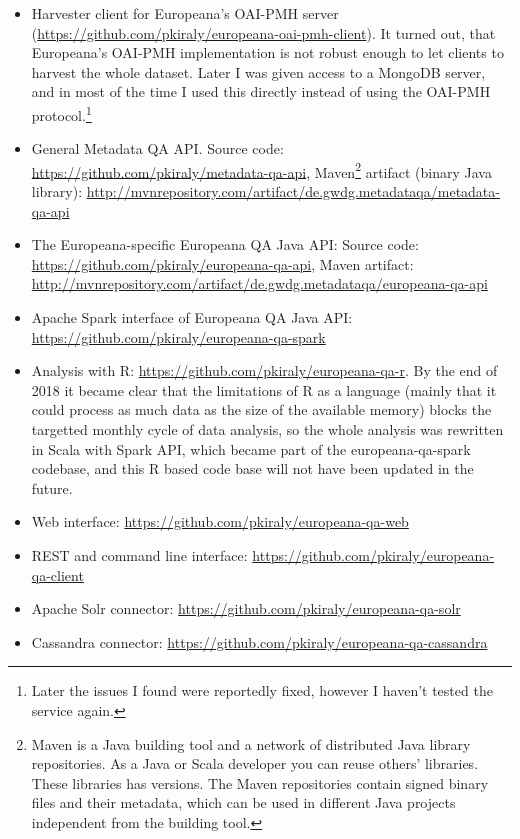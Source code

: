 \begin{itemize}
  \setlength{\parskip}{0pt}
  \setlength{\itemsep}{0pt plus 1pt}
\item Harvester client for Europeana's OAI-PMH server (\url{https://github.com/pkiraly/europeana-oai-pmh-client}). It turned out, that Europeana's OAI-PMH implementation is not robust enough to let clients to harvest the whole dataset. Later I was given access to a MongoDB server, and in most of the time I used this directly instead of using the OAI-PMH protocol.\footnote{Later the issues I found were reportedly fixed, however I haven't tested the service again.}
\item General Metadata QA API. Source code: \url{https://github.com/pkiraly/metadata-qa-api},
Maven\footnote{Maven is a Java building tool and a network of distributed Java library repositories. As a Java or Scala developer you can reuse others' libraries. These libraries has versions. The Maven repositories contain signed binary files and their metadata, which can be used in different Java projects independent from the building tool.} artifact (binary Java library): \url{http://mvnrepository.com/artifact/de.gwdg.metadataqa/metadata-qa-api}
\item The Europeana-specific Europeana QA Java API:
Source code: \url{https://github.com/pkiraly/europeana-qa-api},
Maven artifact: \url{http://mvnrepository.com/artifact/de.gwdg.metadataqa/europeana-qa-api}
\item Apache Spark interface of Europeana QA Java API: \url{https://github.com/pkiraly/europeana-qa-spark}
\item Analysis with R: \url{https://github.com/pkiraly/europeana-qa-r}. By the end of 2018 it became clear that the limitations of R as a language (mainly that it could process as much data as the size of the available memory) blocks the targetted monthly cycle of data analysis, so the whole analysis was rewritten in Scala with Spark API, which became part of the europeana-qa-spark codebase, and this R based code base will not have been updated in the future.
\item Web interface: \url{https://github.com/pkiraly/europeana-qa-web}
\item REST and command line interface: \url{https://github.com/pkiraly/europeana-qa-client}
\item Apache Solr connector: \url{https://github.com/pkiraly/europeana-qa-solr}
\item Cassandra connector: \url{https://github.com/pkiraly/europeana-qa-cassandra}

\end{itemize}
